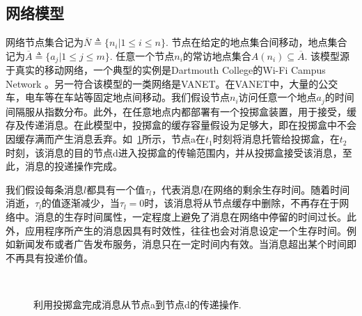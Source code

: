\subsection{网络模型}

网络节点集合记为$\overline{N}\triangleq\{n_i|1\leq i\leq n\}$. 节点在给定的地点集合间移动，地点集合记为$\overline{A}\triangleq\{a_j|1\leq j \leq m\}$. 任意一个节点$n_i$的常访地点集合$A(n_i)\subseteq \overline{A}$. 该模型源于真实的移动网络，一个典型的实例是Dartmouth College的Wi-Fi Campus Network \cite{Jedari:2013uo}。另一符合该模型的一类网络是VANET。在VANET中，大量的公交车，电车等在车站等固定地点间移动。我们假设节点$n_i$访问任意一个地点$a_j$的时间间隔服从指数分布。此外，在任意地点内都部署有一个投掷盒装置，用于接受，缓存及传递消息。在此模型中，投掷盒的缓存容量假设为足够大，即在投掷盒中不会因缓存满而产生消息丢弃。如\figurename~\ref{fig:chap3_box}所示，节点a在$t_1$时刻将消息托管给投掷盒，在$t_2$时刻，该消息的目的节点d进入投掷盒的传输范围内，并从投掷盒接受该消息，至此，消息的投递操作完成。

我们假设每条消息$l$都具有一个值$\tau_l$，代表消息$l$在网络的剩余生存时间。随着时间消逝，$\tau_l$的值逐渐减少，当$\tau_l=0$时，该消息将从节点缓存中删除，不再存在于网络中。消息的生存时间属性，一定程度上避免了消息在网络中停留的时间过长。此外，应用程序所产生的消息因具有时效性，往往也会对消息设定一个生存时间。例如新闻发布或者广告发布服务，消息只在一定时间内有效。当消息超出某个时间即不再具有投递价值。

\begin{figure}
\centering
{}~~~~~~
\caption{利用投掷盒完成消息从节点a到节点d的传递操作.}
\label{fig:chap3_box}
\end{figure}


